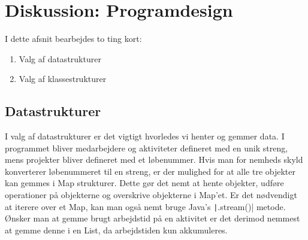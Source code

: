 \section{Diskussion: Programdesign}
I dette afsnit bearbejdes to ting kort:
\begin{enumerate}
    \item Valg af datastrukturer
    \item Valg af klassestrukturer
\end{enumerate}
\subsection{Datastrukturer} I valg af datastrukturer er det vigtigt hvorledes vi henter og gemmer data. I programmet bliver medarbejdere og aktiviteter defineret med en unik streng, mens projekter bliver defineret med et løbenummer. Hvis man for nemheds skyld konverterer løbenummeret til en streng, er der mulighed for at alle tre objekter kan gemmes i Map strukturer. Dette gør det nemt at hente objekter, udføre operationer på objekterne og overskrive objekterne i Map'et. Er det nødvendigt at iterere over et Map, kan man også nemt bruge Java's \texttt|.stream()| metode. Ønsker man at gemme brugt arbejdstid på en aktivitet er det derimod nemmest at gemme denne i en List, da arbejdstiden kun akkumuleres.
